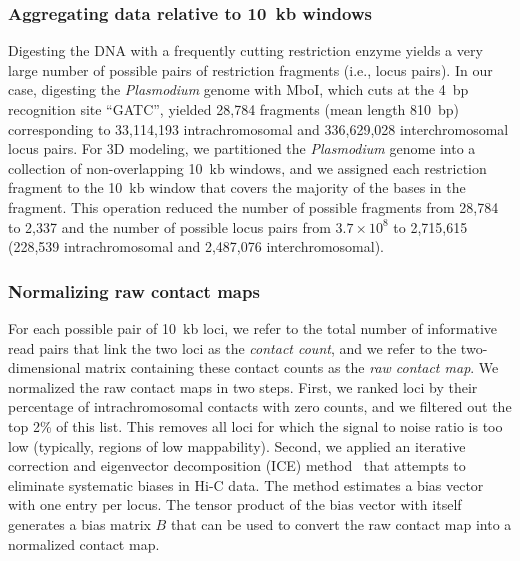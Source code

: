 \subsubsection*{Aggregating data relative to 10~kb windows}
\label{met:10kb}
Digesting the DNA with a frequently cutting restriction enzyme yields a very large
number of possible pairs of restriction fragments (i.e., locus pairs). In our case,
digesting the {\em Plasmodium} genome with MboI, which cuts at the 4~bp recognition
site ``GATC'', yielded 28,784 fragments (mean length 810~bp) corresponding to
33,114,193 intrachromosomal and 336,629,028 interchromosomal locus pairs. For 3D
modeling, we partitioned the {\em Plasmodium} genome into a collection of
non-overlapping 10~kb windows, and we assigned each restriction fragment to the
10~kb window that covers the majority of the bases in the fragment. This operation
reduced the number of possible fragments from 28,784 to 2,337 and the number of
possible locus pairs from $3.7 \times 10^8$ to 2,715,615 (228,539 intrachromosomal
and 2,487,076 interchromosomal).

\subsubsection*{Normalizing raw contact maps}
\label{met:normalization}
For each possible pair of 10~kb loci, we refer to the total number of informative
read pairs that link the two loci as the {\em contact count}, and we refer to the
two-dimensional matrix containing these contact counts as the {\em raw contact map}.
We normalized the raw contact maps in two steps.  First, we ranked loci by their
percentage of intrachromosomal contacts with zero counts, and we filtered out the
top 2\% of this list. This removes all loci for which the signal to noise ratio
is too low (typically, regions of low mappability). Second, we applied an iterative
correction and eigenvector decomposition (ICE) method~\citep{imakaev:iterative}
that attempts to eliminate systematic biases in Hi-C data. The method estimates a
bias vector with one entry per locus. The tensor product of the bias vector with
itself generates a bias matrix $B$ that can be used to convert the raw contact map
into a normalized contact map.

